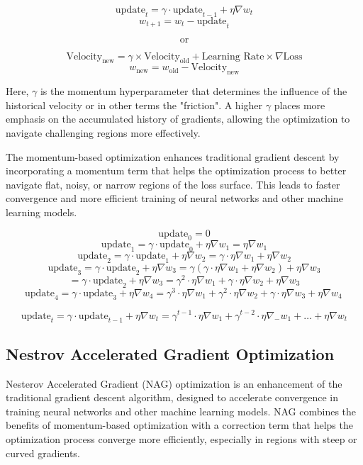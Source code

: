 \documentclass{report}
\begin{document}
$$\text{update}_{t} = \gamma \cdot \text{update}_{t-1}+\eta \nabla w_{t}$$
$$w_{t+1}=w_{t} - \text{update}_{t}$$

$$\text{or}$$

$$ \text{Velocity}_\text{new} = \gamma \times \text{Velocity}_\text{old} + \text{Learning Rate} \times \nabla \text{Loss} $$
$$ w_\text{new} = w_\text{old} - \text{Velocity}_\text{new} $$

Here, \(\gamma\) is the momentum hyperparameter that determines the influence of the historical velocity or in other terms the "friction". A higher \(\gamma\) places more emphasis on the accumulated history of gradients, allowing the optimization to navigate challenging regions more effectively.

The momentum-based optimization enhances traditional gradient descent by incorporating a momentum term that helps the optimization process to better navigate flat, noisy, or narrow regions of the loss surface. This leads to faster convergence and more efficient training of neural networks and other machine learning models.

$$\text{update}_0 = 0$$
$$\text{update}_1 = \gamma \cdot \text{update}_0 + \eta\nabla w_1 = \eta\nabla w_1$$
$$\text{update}_2 = \gamma \cdot \text{update}_1 + \eta\nabla w_2 = \gamma \cdot \eta\nabla w_1 + \eta\nabla w_2$$
$$\text{update}_3=\gamma\cdot \text{update}_2+\eta\nabla w_3=\gamma(\gamma\cdot\eta\nabla w_1+\eta\nabla w_2)+\eta\nabla w_3$$
$$=\gamma\cdot \text{update}_{2}+\eta\nabla w_{3}=\gamma^{2}\cdot\eta\nabla w_{1}+\gamma\cdot\eta\nabla w_{2}+\eta\nabla w_{3}$$
$$\text{update}_{4}=\gamma\cdot \text{update}_{3}+\eta\nabla w_{4}=\gamma^{3}\cdot\eta\nabla w_{1}+\gamma^{2}\cdot\eta\nabla w_{2}+\gamma\cdot\eta\nabla w_{3}+\eta\nabla w_{4}\,$$

$$\text{update}_{t}=\gamma\cdot \text{update}_{t-1}+\eta\nabla w_{t}=\gamma^{t-1}\cdot\eta\nabla w_{1}+\gamma^{t-2}\cdot\eta\nabla_{-}w_{1}+\ldots+\eta\nabla w_{t}$$

\subsection{Nestrov Accelerated Gradient Optimization}
Nesterov Accelerated Gradient (NAG) optimization is an enhancement of the traditional gradient descent algorithm, designed to accelerate convergence in training neural networks and other machine learning models. NAG combines the benefits of momentum-based optimization with a correction term that helps the optimization process converge more efficiently, especially in regions with steep or curved gradients.
\end{document}

